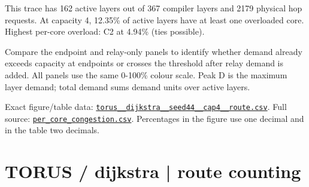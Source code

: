 \documentclass[10pt,a4paper]{article}
\begin{document}
This trace has 162 active layers out of 367 compiler layers and 2179 physical hop requests. At capacity 4, 12.35\% of active layers have at least one overloaded core. Highest per-core overload: C2 at 4.94\% (ties possible).\par
Compare the endpoint and relay-only panels to identify whether demand already exceeds capacity at endpoints or crosses the threshold after relay demand is added. All panels use the same 0-100\% colour scale. Peak D is the maximum layer demand; total demand sums demand units over active layers.\par
Exact figure/table data: \href{\detokenize{file:///home/dhruv-pansuriya/Documents/BTP/Compiler-Driven-ACE/output/pdf/qaoa_methods_congestion/tables/torus__dijkstra__seed44__cap4__route.csv}}{\nolinkurl{torus__dijkstra__seed44__cap4__route.csv}}. Full source: \href{\detokenize{file:///home/dhruv-pansuriya/Documents/BTP/Compiler-Driven-ACE/results/qaoa_2seed_2026-10-26/congestion/per_core_congestion.csv}}{\nolinkurl{per_core_congestion.csv}}. Percentages in the figure use one decimal and in the table two decimals.\par
\clearpage
\section*{TORUS / dijkstra | route counting}
\end{document}

